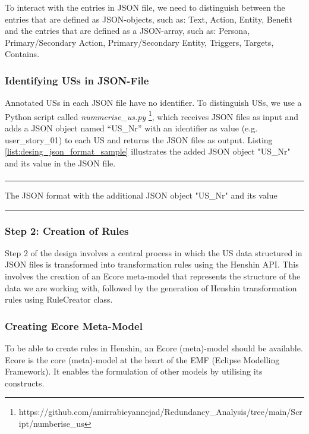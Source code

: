 To interact with the entries in JSON file, we need to distinguish between the entries that are defined as JSON-objects, such as: {Text, Action, Entity, Benefit} and the entries that are defined as a JSON-array, such as: {Persona, Primary/Secondary Action, Primary/Secondary Entity, Triggers, Targets, Contains}.
\subsubsection*{Identifying USs in JSON-File}\label{desing_workflow_nummerize_us}
Annotated USs in each JSON file have no identifier. To distinguish USs, we use a Python script called \textit{nummerise\_us.py} \footnote{https://github.com/amirrabieyannejad/Redundancy\_Analysis/tree/main/Script/numberise\_us}, which receives JSON files as input and adds a JSON object named \enquote{US\_Nr} with an identifier as value (e.g. user\_story\_01) to each US and returns the JSON files as output.
Listing \ref{list:desing_json_format_sample} illustrates the added JSON object "US\_Nr" and its value in the JSON file.
\begin{MyListing}
	\paragraph{}
	\hrule
	\centering
	
	\caption{The JSON format with the additional JSON object "US\_Nr" and its value}\label{list:desing_json_format_sample}
	\hrule
\end{MyListing}
\subsubsection*{Step 2: Creation of Rules}\label{design_step_2}
Step 2 of the design involves a central process in which the US data structured in JSON files is transformed into transformation rules using the Henshin API. This involves the creation of an Ecore meta-model that represents the structure of the data we are working with, followed by the generation of Henshin transformation rules using RuleCreator class.
\subsubsection*{Creating Ecore Meta-Model}\label{design_workflow_ecore}
To be able to create rules in Henshin, an Ecore (meta)-model should be available. Ecore is the core (meta)-model at the heart of the EMF (Eclipse Modelling Framework). It enables the formulation of other models by utilising its constructs.

